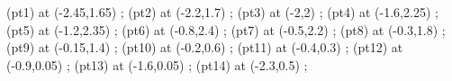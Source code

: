 
 (pt1) at (-2.45,1.65) {};
 (pt2) at (-2.2,1.7) {};
 (pt3) at (-2,2) {};
 (pt4) at (-1.6,2.25) {};
 (pt5) at (-1.2,2.35) {};
 (pt6) at (-0.8,2.4) {};
 (pt7) at (-0.5,2.2) {};
 (pt8) at (-0.3,1.8) {};
 (pt9) at (-0.15,1.4) {};
 (pt10) at (-0.2,0.6) {};
 (pt11) at (-0.4,0.3) {};
 (pt12) at (-0.9,0.05) {};
 (pt13) at (-1.6,0.05) {};
 (pt14) at (-2.3,0.5) {};

